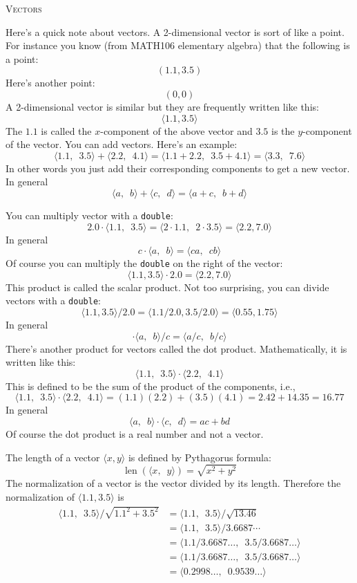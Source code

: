 \textsc{Vectors}

Here's a quick note about vectors.
A 2-dimensional vector is sort of like a point.
For instance you know
(from MATH106 elementary algebra) that the following is a point:
\[
	(1.1, 3.5)
\]
Here's another point:
\[
	(0, 0)
\]
A 2-dimensional vector is similar but they are frequently written like this:
\[
	\langle 1.1, 3.5 \rangle
\]
The $1.1$ is called the $x$-component of the above vector and $3.5$ is
the $y$-component of the vector. You can add vectors. Here's an example:
\[
	\langle 1.1, \,\,\, 3.5 \rangle
        +
        \langle 2.2, \,\,\, 4.1 \rangle
        =
        \langle 1.1 + 2.2, \,\,\, 3.5 + 4.1 \rangle
        =
        \langle 3.3, \,\,\, 7.6 \rangle
\]
In other words you just add their corresponding components to get a new vector.
In general
\[
	\langle a, \,\,\, b \rangle
        +
        \langle c, \,\,\, d \rangle
        =
        \langle a + c, \,\,\, b + d \rangle
\]

You can multiply vector with a \verb!double!:
\[
	2.0 \cdot  \langle 1.1, \,\,\, 3.5 \rangle =
        \langle 2 \cdot 1.1, \,\,\, 2 \cdot 3.5 \rangle
        =
        \langle 2.2, 7.0 \rangle
\]
In general
\[
	c \cdot \langle a, \,\,\, b \rangle
        =
        \langle ca, \,\,\, cb \rangle
\]
Of course you can multiply the \verb!double! on the right of the vector:
\[
	\langle 1.1, 3.5 \rangle  \cdot  2.0 = 
        \langle 2.2, 7.0 \rangle
\]
This product is called the scalar product.
Not too surprising, you can divide vectors with a \texttt{double}:
\[
	\langle 1.1, 3.5 \rangle / 2.0 =
        \langle 1.1 / 2.0, 3.5 / 2.0 \rangle =  \langle 0.55, 1.75 \rangle
\]
In general
\[
	\cdot \langle a, \,\,\, b \rangle / c
        =
        \langle a/c, \,\,\, b/c \rangle
\]
There's another product for vectors called the dot product.
Mathematically, it is written like this:
\[
	\langle 1.1, \,\,\, 3.5 \rangle \cdot \langle 2.2, \,\,\, 4.1 \rangle
\]
This is defined to be the sum of the product of the components, i.e.,
\[
	\langle 1.1, \,\,\, 3.5 \rangle \cdot
        \langle 2.2, \,\,\, 4.1 \rangle
        =
        (1.1)(2.2) + (3.5)(4.1)
        = 2.42 + 14.35 = 16.77
\]
In general
\[
	\langle a, \,\,\, b \rangle \cdot
        \langle c, \,\,\, d \rangle
        =
        ac + bd
\]
Of course the dot product is a real number and not a vector.

The length of a vector $\langle x, y \rangle$ is defined by Pythagorus formula:
\[
\operatorname{len}( \langle x, \,\,\, y \rangle ) = \sqrt{x^2 + y^2}
\]
The normalization of a vector is the vector divided by its length.
Therefore the normalization of
$\langle 1.1, 3.5 \rangle$ is
\begin{align*}
\langle 1.1, \,\,\, 3.5 \rangle / \sqrt{1.1^2 + 3.5^2}
&= \langle 1.1, \,\,\, 3.5 \rangle / \sqrt{13.46} \\
&= \langle 1.1, \,\,\, 3.5 \rangle / 3.6687\cdots \\
&= \langle 1.1/3.6687\ldots, \,\,\, 3.5/3.6687\ldots \rangle \\
&= \langle 1.1/3.6687\ldots, \,\,\, 3.5/3.6687\ldots \rangle \\
&= \langle 0.2998\ldots, \,\,\, 0.9539\ldots \rangle 
\end{align*}

